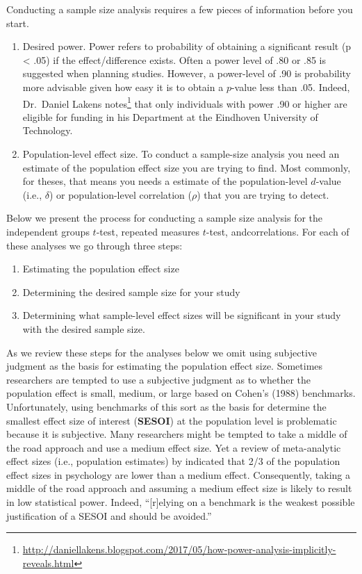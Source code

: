 \documentclass[
]{krantz}
\providecommand{\tightlist}{%
  \setlength{\itemsep}{0pt}\setlength{\parskip}{0pt}}
\renewcommand{\href}[2]{#2\footnote{\url{#1}}}
\begin{document}
Conducting a sample size analysis requires a few pieces of information before you start.

\begin{enumerate}
\def\labelenumi{\arabic{enumi}.}
\item
  Desired power. Power refers to probability of obtaining a significant result (p \textless{} .05) if the effect/difference exists. Often a power level of .80 or .85 is suggested when planning studies. However, a power-level of .90 is probability more advisable given how easy it is to obtain a \(p\)-value less than .05. Indeed, Dr.~Daniel Lakens \href{http://daniellakens.blogspot.com/2017/05/how-power-analysis-implicitly-reveals.html}{notes} that only individuals with power .90 or higher are eligible for funding in his Department at the Eindhoven University of Technology.
\item
  Population-level effect size. To conduct a sample-size analysis you need an estimate of the population effect size you are trying to find. Most commonly, for theses, that means you needs a estimate of the population-level \(d\)-value (i.e., \(\delta\)) or population-level correlation (\(\rho\)) that you are trying to detect.
\end{enumerate}

Below we present the process for conducting a sample size analysis for the independent groups \(t\)-test, repeated measures \(t\)-test, andcorrelations. For each of these analyses we go through three steps:

\begin{enumerate}
\def\labelenumi{\arabic{enumi}.}
\tightlist
\item
  Estimating the population effect size
\item
  Determining the desired sample size for your study
\item
  Determining what sample-level effect sizes will be significant in your study with the desired sample size.
\end{enumerate}

As we review these steps for the analyses below we omit using subjective judgment as the basis for estimating the population effect size. Sometimes researchers are tempted to use a subjective judgment as to whether the population effect is small, medium, or large based on Cohen's (1988) benchmarks. Unfortunately, using benchmarks of this sort as the basis for determine the smallest effect size of interest (\textbf{SESOI}) at the population level is problematic because it is subjective. Many researchers might be tempted to take a middle of the road approach and use a medium effect size. Yet a review of meta-analytic effect sizes (i.e., population estimates) by \citep{hemphill2003interpreting} indicated that 2/3 of the population effect sizes in psychology are lower than a medium effect. Consequently, taking a middle of the road approach and assuming a medium effect size is likely to result in low statistical power. Indeed, ``{[}r{]}elying on a benchmark is the weakest possible justification of a SESOI and should be avoided.'' \citep[p.~262,][]{lakens2018equivalence}
\end{document}
